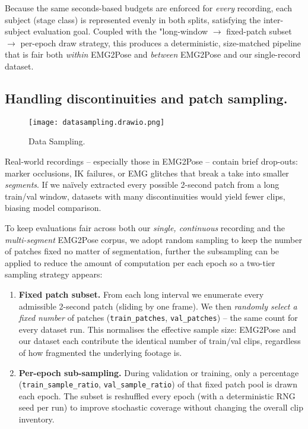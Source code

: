 Because the same seconds-based budgets are enforced for \emph{every} recording,
each subject (stage class) is represented evenly in both splits, satisfying the
inter-subject evaluation goal. Coupled with the "long-window $\to$ fixed-patch
subset $\to$ per-epoch draw strategy, this produces a deterministic,
size-matched pipeline that is fair both \emph{within} EMG2Pose and \emph{between}
EMG2Pose and our single-record dataset.

\subsection{Handling discontinuities and patch sampling.}

\begin{figure}[H]
    \centering
    \texttt{[image: datasampling.drawio.png]}
    \caption{Data Sampling.}
    \label{fig:datasampling}
\end{figure}

Real-world recordings -- especially those in EMG2Pose -- contain brief drop-outs:
marker occlusions, IK failures, or EMG glitches that break a take into smaller
\emph{segments}. If we naïvely extracted every possible 2-second patch from a
long train/val window, datasets with many discontinuities would yield fewer clips, biasing model comparison.

To keep evaluations fair across both our \emph{single, continuous} recording and the \emph{multi-segment} EMG2Pose corpus, we adopt random sampling to keep the number of patches fixed no matter of segmentation, further the subsampling can be applied to reduce the amount of computation per each epoch so a two-tier sampling strategy appears:

\begin{enumerate}[label=\arabic*.]
  \item \textbf{Fixed patch subset.}
        From each long interval we enumerate every admissible 2-second patch
        (sliding by one frame).
        We then \emph{randomly select a fixed number} of patches
        (\texttt{train\_patches}, \texttt{val\_patches}) -- the same count for
        every dataset run.
        This normalises the effective sample size: EMG2Pose and our dataset
        each contribute the identical number of train/val clips, regardless of
        how fragmented the underlying footage is.

  \item \textbf{Per-epoch sub-sampling.}
        During validation or training, only a percentage
        (\texttt{train\_sample\_ratio}, \texttt{val\_sample\_ratio}) of that
        fixed patch pool is drawn each epoch.
        The subset is reshuffled every epoch (with a deterministic RNG seed per
        run) to improve stochastic coverage without changing the overall clip
        inventory.

\end{enumerate}

